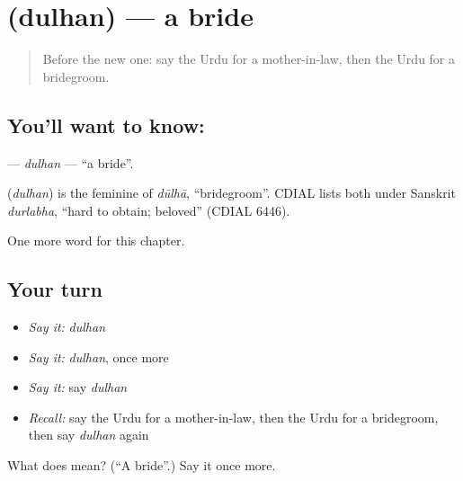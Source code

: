 \section[\texorpdfstring{\ur{دلہن} (dulhan)}{دلہن (dulhan)}]{ (dulhan) — a bride}

\label{lesson:UR-C230-dulhan}



\begin{quote}
Before the new one: say the Urdu for a mother-in-law, then the Urdu for a bridegroom.
\end{quote}

\subsection*{You'll want to know: }
\textbf{} — \emph{dulhan} — \textquotedblleft{}a bride\textquotedblright{}.

\begin{cousinweb}
\textbf{} (\emph{dulhan}) is the feminine of \emph{dūlhā}, \textquotedblleft{}bridegroom\textquotedblright{}. CDIAL lists both under Sanskrit \emph{durlabha}, \textquotedblleft{}hard to obtain; beloved\textquotedblright{} (CDIAL 6446).
\end{cousinweb}

\begin{grammarlens}[title={What you've built}]
One more word for this chapter.
\end{grammarlens}

\subsection*{Your turn}
\begin{itemize}
\raggedright
  \item \emph{Say it:} \emph{dulhan}
  \item \emph{Say it:} \emph{dulhan}, once more
  \item \emph{Say it:} say \emph{dulhan}
  \item \emph{Recall:} say the Urdu for a mother-in-law, then the Urdu for a bridegroom, then say \emph{dulhan} again
\end{itemize}

\begin{tcolorbox}[breakable,colback=teal!4,colframe=teal!35!black,title={Before you move on}]
What does  mean? (\textquotedblleft{}A bride\textquotedblright{}.) Say it once more.
\end{tcolorbox}

